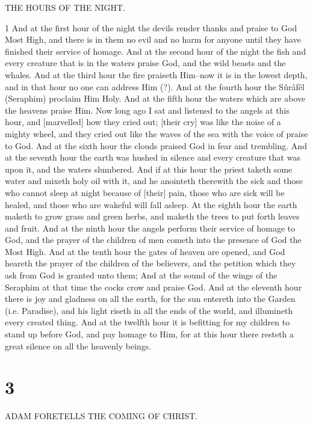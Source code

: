 \par THE HOURS OF THE NIGHT.

\par 1 And at the first hour of the night the devils render thanks and praise to God Most High, and there is in them no evil and no harm for anyone until they have finished their service of homage. And at the second hour of the night the fish and every creature that is in the waters praise God, and the wild beasts and the whales. And at the third hour the fire praiseth Him--now it is in the lowest depth, and in that hour no one can address Him (?). And at the fourth hour the Sûrâfêl (Seraphim) proclaim Him Holy. And at the fifth hour the waters which are above the heavens praise Him. Now long ago I sat and listened to the angels at this hour, and [marvelled] how they cried out; [their cry] was like the noise of a mighty wheel, and they cried out like the waves of the sea with the voice of praise to God. And at the sixth hour the clouds praised God in fear and trembling. And at the seventh hour the earth was hushed in silence and every creature that was upon it, and the waters slumbered. And if at this hour the priest taketh some water and mixeth holy oil with it, and he anointeth therewith the sick and those who cannot sleep at night because of [their] pain, those who are sick will be healed, and those who are wakeful will fall asleep. At the eighth hour the earth maketh to grow grass and green herbs, and maketh the trees to put forth leaves and fruit. And at the ninth hour the angels perform their service of homage to God, and the prayer of the children of men cometh into the presence of God the Most High. And at the tenth hour the gates of heaven are opened, and God heareth the prayer of the children of the believers, and the petition which they ask from God is granted unto them; And at the sound of the wings of the Seraphim at that time the cocks crow and praise God. And at the eleventh hour there is joy and gladness on all the earth, for the sun entereth into the Garden (i.e. Paradise), and his light riseth in all the ends of the world, and illumineth every created thing. And at the twelfth hour it is befitting for my children to stand up before God, and pay homage to Him, for at this hour there resteth a great silence on all the heavenly beings.

\chapter{3}

\par ADAM FORETELLS THE COMING OF CHRIST.

